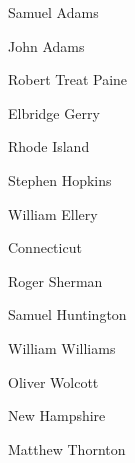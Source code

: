 \documentclass[a4paper,landscape,10pt]{article}
\begin{document}
Samuel Adams

John Adams

Robert Treat Paine

Elbridge Gerry



Rhode Island

Stephen Hopkins

William Ellery



Connecticut

Roger Sherman

Samuel Huntington

William Williams

Oliver Wolcott



New Hampshire

Matthew Thornton


\begin{multicols}{3}
{}
\end{multicols}
\end{document}
